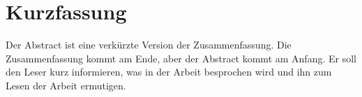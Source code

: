 \chapter*{Kurzfassung}
Der Abstract ist eine verkürzte Version der Zusammenfassung. Die Zusammenfassung kommt am Ende, aber der Abstract kommt am Anfang. Er soll den Leser kurz informieren, was in der Arbeit besprochen wird und ihn zum Lesen der Arbeit ermutigen.